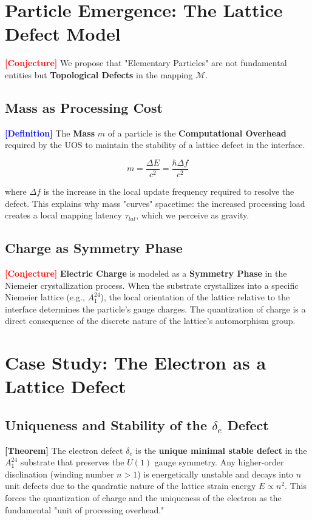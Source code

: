 \documentclass[11pt,titlepage]{article}
\newcommand{\tagdef}{\textcolor{blue}{\textbf{[Definition]}} }
\newcommand{\tagtheo}{\textcolor{green!60!black}{\textbf{[Theorem]}} }
\newcommand{\tagconj}{\textcolor{red}{\textbf{[Conjecture]}} }
\begin{document}
\section{Particle Emergence: The Lattice Defect Model}
\label{sec:particles}
\tagconj We propose that "Elementary Particles" are not fundamental entities but \textbf{Topological Defects} in the mapping $\mathcal{M}$.

\subsection{Mass as Processing Cost}
\tagdef The \textbf{Mass} $m$ of a particle is the \textbf{Computational Overhead} required by the UOS to maintain the stability of a lattice defect in the interface. 

\begin{equation}
m = \frac{\Delta E}{c^2} = \frac{\hbar \Delta f}{c^2}
\end{equation}

where $\Delta f$ is the increase in the local update frequency required to resolve the defect. This explains why mass "curves" spacetime: the increased processing load creates a local mapping latency $\tau_{lat}$, which we perceive as gravity.

\subsection{Charge as Symmetry Phase}
\tagconj \textbf{Electric Charge} is modeled as a \textbf{Symmetry Phase} in the Niemeier crystallization process. When the substrate crystallizes into a specific Niemeier lattice (e.g., $A_1^{24}$), the local orientation of the lattice relative to the interface determines the particle's gauge charges. The quantization of charge is a direct consequence of the discrete nature of the lattice's automorphism group.

\section{Case Study: The Electron as a Lattice Defect}
\subsection{Uniqueness and Stability of the $\delta_e$ Defect}
\tagtheo The electron defect $\delta_e$ is the \textbf{unique minimal stable defect} in the $A_1^{24}$ substrate that preserves the $U(1)$ gauge symmetry. Any higher-order disclination (winding number $n > 1$) is energetically unstable and decays into $n$ unit defects due to the quadratic nature of the lattice strain energy $E \propto n^2$. This forces the quantization of charge and the uniqueness of the electron as the fundamental "unit of processing overhead."
\end{document}
